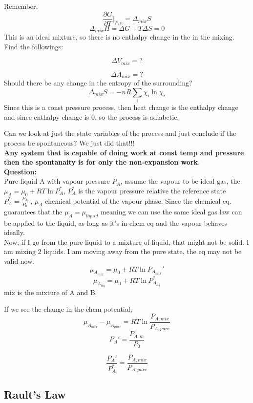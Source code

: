 \documentclass{article}
\theoremstyle{definition}
\begin{document}
Remember,
\[
\frac{\partial G}{\partial T}|_{P,n} = \Delta_{mix} S
\]
\[
\Delta_{mix} H = \Delta G + T\Delta S = 0
\]
This is an ideal mixture, so there is no enthalpy change in the in the mixing.\\
Find the followings:

\[
\Delta V_{mix} = ?
\]

\[
\Delta A_{mix } = ?
\]
Should there be any change in the entropy of the surrounding? 
\[
\Delta_{mix} S = -nR\sum_i \chi_i\ln{\chi_i}
\]
Since this is a const pressure process, then heat change is the enthalpy change and since enthalpy change is 0, so the process is adiabetic.

Can we look at just the state variables of the process and just conclude if the process be spontaneous?
We just did that!!!\\
\textbf{
Any system that is capable of doing work at const temp and pressure then the spontanaity is for only the non-expansion work.
}\\
\textbf{Question:}
\\
Pure liquid A with vapour pressure $P_A$, assume the vapour to be ideal gas, the $\mu_A = \mu_0 + RT\ln{P_A^*}$, $P_A^*$ is the vapour pressure relative the reference state $P_A^* = \frac{P_A}{P_0}$ , $\mu_A$ chemical potential of the vapour phase. Since the chemical eq. guarantees that the $\mu_A = \mu_{liquid}$ meaning we can use the same ideal gas law can be applied to the liquid, as long as it's in chem eq and the vapour behaves ideally.
\\
Now, if I go from the pure liquid to a mixture of liquid, that might not be solid. I am mixing 2 liquids. I am moving away from the pure state, the eq may not be valid now. 
\[
\mu_{A_{mix}} = \mu_0  + RT\ln{P_{A_{mix}}'}
\]
\[
\mu_{A_{liq}} = \mu_0  + RT\ln{P_{A_{liq}}^*}
\]
mix is the mixture of A and B. 

If we see the change in the chem potential,
\[
\mu_{A_{mix}} - \mu_{A_{pure}} = RT\ln{\frac{P_{A, mix}}{P_{A,pure}}}
\]
\[
P_A' = \frac{P_{A,m}}{P_0}
\]

\[
\frac{P_A'}{P_A^*} = \frac{P_{A,mix}}{P_{A, pure}}
\]

\subsection{Rault's Law}
\end{document}
